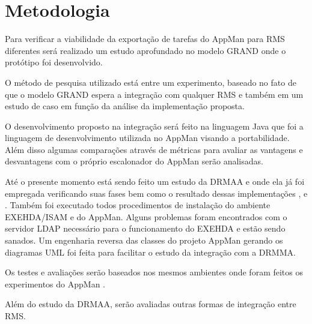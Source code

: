 \section{Metodologia}
\label{cap:metodologia}

Para verificar a viabilidade da exportação de tarefas do AppMan para RMS diferentes será realizado um estudo aprofundado no modelo GRAND onde o protótipo foi desenvolvido.

O método de pesquisa utilizado está entre um experimento, baseado no fato de que o modelo GRAND espera a integração com qualquer RMS e também em um estudo de caso em função da análise da implementação proposta.

O desenvolvimento proposto na integração será feito na linguagem Java que foi a linguagem de desenvolvimento utilizada no AppMan visando a portabilidade. Além disso algumas comparações através de métricas para avaliar as vantagens e desvantagens com o próprio escalonador do AppMan serão analisadas.

Até o presente momento está sendo feito um estudo da DRMAA e onde ela já foi empregada verificando suas fases bem como o resultado dessas implementações \cite{Templeton}, \cite{Llorente2005} e \cite{Haas2004}. Também foi executado todos procedimentos de instalação do ambiente EXEHDA/ISAM e do AppMan. Alguns problemas foram encontrados com o servidor LDAP necessário para o funcionamento do EXEHDA e estão sendo sanados. Um engenharia reversa das classes do projeto AppMan gerando os diagramas UML foi feita para facilitar o estudo da integração com a DRMMA.

Os testes e avaliações serão baseados nos mesmos ambientes onde foram feitos os experimentos do AppMan \cite{Mangan2006}. 

Além do estudo da DRMAA, serão avaliadas outras formas de integração entre RMS.
